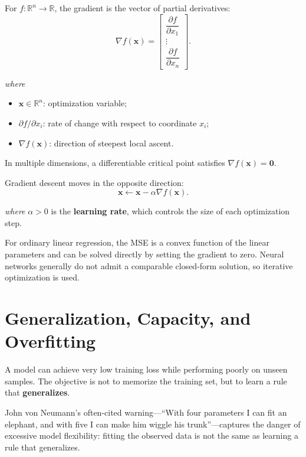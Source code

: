 \documentclass[11pt,a4paper]{report}
\newcommand{\vect}[1]{\bm{#1}}
\newcommand{\R}{\mathbb{R}}
\newcommand{\wherelegend}{\par\smallskip\textit{where}\vspace{-0.3em}}
\begin{document}
For $f:\R^n\to\R$, the gradient is the vector of partial derivatives:
\begin{equation}
  \nabla f(\vect{x}) =
  \begin{bmatrix}
    \dfrac{\partial f}{\partial x_1}\\[0.45em]
    \vdots\\[0.2em]
    \dfrac{\partial f}{\partial x_n}
  \end{bmatrix}.
  \label{eq:gradient}
\end{equation}
\wherelegend
\begin{itemize}
  \item $\vect{x}\in\R^n$: optimization variable;
  \item $\partial f/\partial x_i$: rate of change with respect to coordinate $x_i$;
  \item $\nabla f(\vect{x})$: direction of steepest local ascent.
\end{itemize}
In multiple dimensions, a differentiable critical point satisfies $\nabla f(\vect{x})=\vect{0}$.

Gradient descent moves in the opposite direction:
\begin{equation}
  \vect{x} \leftarrow \vect{x} - \alpha\nabla f(\vect{x}).
  \label{eq:gradient-descent}
\end{equation}
\wherelegend
$\alpha>0$ is the \textbf{learning rate}, which controls the size of each optimization step.

For ordinary linear regression, the MSE is a convex function of the linear parameters and can be solved directly by setting the gradient to zero. Neural networks generally do not admit a comparable closed-form solution, so iterative optimization is used.

\section{Generalization, Capacity, and Overfitting}

A model can achieve very low training loss while performing poorly on unseen samples. The objective is not to memorize the training set, but to learn a rule that \textbf{generalizes}.

\begin{remarkbox}[title={Overfitting intuition}]
John von Neumann's often-cited warning---``With four parameters I can fit an elephant, and with five I can make him wiggle his trunk''---captures the danger of excessive model flexibility: fitting the observed data is not the same as learning a rule that generalizes.
\end{remarkbox}
\end{document}
